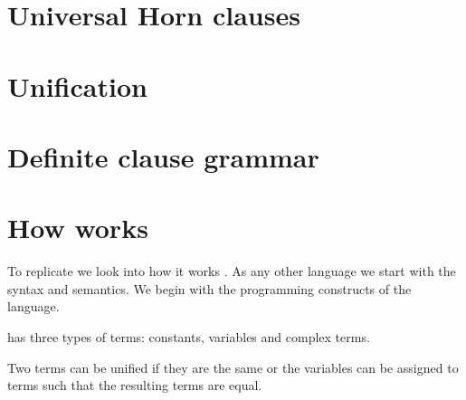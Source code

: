 \documentclass[thesis-solanki.tex]{subfiles}
\begin{document}
\section{Universal Horn clauses}


\section{Unification}



\section{Definite clause grammar}

\section{How  works}

To replicate  we look into how it works .
%
As any other language we start with the syntax and semantics.
We begin with the programming constructs of the language.

 has three types of terms: constants, variables and complex terms.

Two terms can be unified if they are the same or the variables can be assigned to terms such that the resulting
terms are equal.
\end{document}
